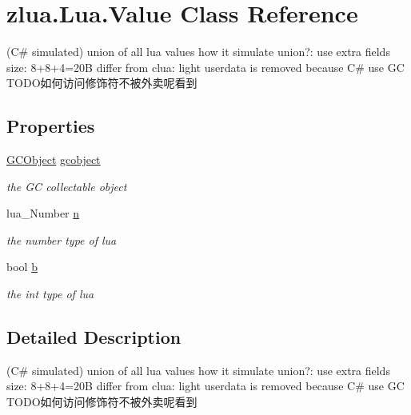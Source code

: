 \hypertarget{classzlua_1_1_lua_1_1_value}{}\section{zlua.\+Lua.\+Value Class Reference}
\label{classzlua_1_1_lua_1_1_value}


(C\# simulated) union of all lua values how it simulate union?\+: use extra fields size\+: 8+8+4=20B differ from clua\+: light userdata is removed because C\# use GC T\+O\+D\+O如何访问修饰符不被外卖呢看到  


\subsection*{Properties}
\begin{DoxyCompactItemize}
\item 
\mbox{\hyperlink{classzlua_1_1_lua_1_1_g_c_object}{G\+C\+Object}} \mbox{\hyperlink{classzlua_1_1_lua_1_1_value_aa3721ec46d8ef772d1320223708d1ff1}{gcobject}}
\begin{DoxyCompactList}\small\item\em the GC collectable object \end{DoxyCompactList}\item 
lua\+\_\+\+Number \mbox{\hyperlink{classzlua_1_1_lua_1_1_value_ad1d47c91a55ca1bb270a22c7c318367b}{n}}
\begin{DoxyCompactList}\small\item\em the number type of lua \end{DoxyCompactList}\item 
bool \mbox{\hyperlink{classzlua_1_1_lua_1_1_value_a2ab66efb3c8af25dc58ee788f7f2d243}{b}}
\begin{DoxyCompactList}\small\item\em the int type of lua \end{DoxyCompactList}\end{DoxyCompactItemize}


\subsection{Detailed Description}
(C\# simulated) union of all lua values how it simulate union?\+: use extra fields size\+: 8+8+4=20B differ from clua\+: light userdata is removed because C\# use GC T\+O\+D\+O如何访问修饰符不被外卖呢看到 



